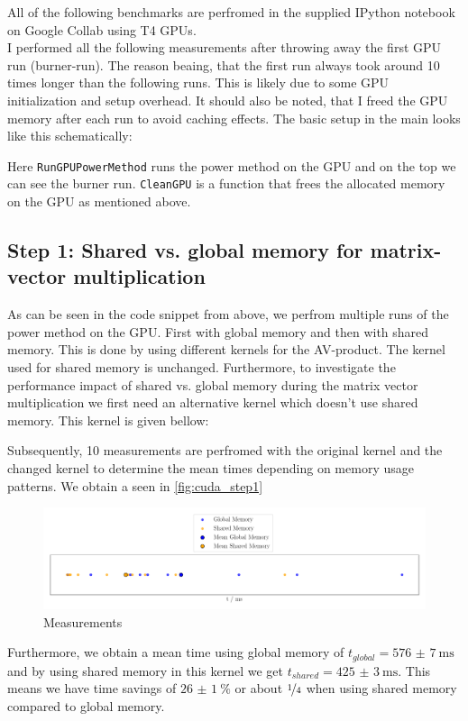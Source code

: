 All of the following benchmarks are perfromed in the supplied IPython notebook on Google Collab using T4 GPUs.\\ 

I performed all the following measurements after throwing away the first GPU run (burner-run). The reason beaing, that the first run always took around 10 times longer than the following runs. This is likely due to some GPU initialization and setup overhead. It should also be noted, that I freed the GPU memory after each run to avoid caching effects. The basic setup in the main looks like this schematically: 

Here \texttt{RunGPUPowerMethod} runs the power method on the GPU and on the top we can see the burner run. \texttt{CleanGPU} is a function that frees the allocated memory on the GPU as mentioned above.\\


\subsection{Step 1: Shared vs. global memory for matrix-vector multiplication}
As can be seen in the code snippet from above, we perfrom multiple runs of the power method on the GPU. First with global memory and then with shared memory. This is done by using different kernels for the AV-product. The kernel used for shared memory is unchanged.
Furthermore, to investigate the performance impact of shared vs. global memory during the matrix vector multiplication we first need an alternative kernel which doesn't use shared memory. This kernel is given bellow: 

Subsequently, 10 measurements are perfromed with the original kernel and the changed kernel to determine the mean times depending on memory usage patterns. 
We obtain a  seen in \autoref{fig:cuda_step1}
\begin{figure}[H]
    \centering
    \includegraphics[width=\textwidth]{../fig/lab3/step1.png}
    \caption{Measurements }
    \label{fig:cuda_step1}
\end{figure}
Furthermore, we obtain a mean time using global memory of $t_{global} = \SI{576(7)}{\milli\second}$ and by using shared memory in this kernel we get $t_{shared} = \SI{425(3)}{\milli\second}$. 
This means we have time savings of $\SI{26(1)}{\percent}$ or about $\nicefrac{1}{4}$ when using shared memory compared to global memory. 
